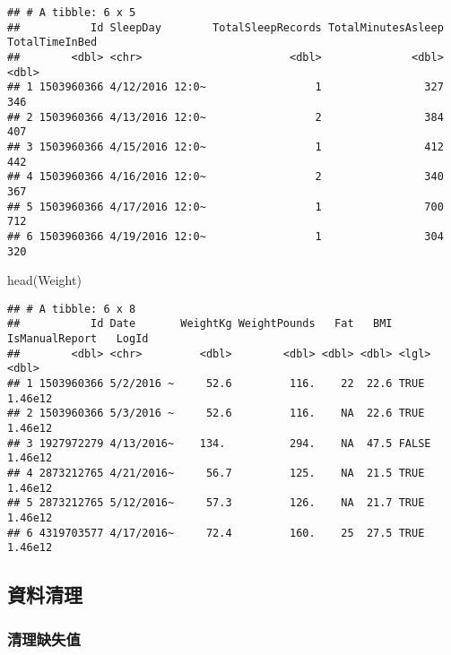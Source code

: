 \documentclass[
]{article}
\newenvironment{Shaded}{\begin{snugshade}}{\end{snugshade}}
\newcommand{\FunctionTok}[1]{\textcolor[rgb]{0.00,0.00,0.00}{#1}}
\newcommand{\NormalTok}[1]{#1}
\begin{document}
\begin{verbatim}
## # A tibble: 6 x 5
##           Id SleepDay        TotalSleepRecords TotalMinutesAsleep TotalTimeInBed
##        <dbl> <chr>                       <dbl>              <dbl>          <dbl>
## 1 1503960366 4/12/2016 12:0~                 1                327            346
## 2 1503960366 4/13/2016 12:0~                 2                384            407
## 3 1503960366 4/15/2016 12:0~                 1                412            442
## 4 1503960366 4/16/2016 12:0~                 2                340            367
## 5 1503960366 4/17/2016 12:0~                 1                700            712
## 6 1503960366 4/19/2016 12:0~                 1                304            320
\end{verbatim}

\begin{Shaded}
\begin{Highlighting}[]
\FunctionTok{head}\NormalTok{(Weight)}
\end{Highlighting}
\end{Shaded}

\begin{verbatim}
## # A tibble: 6 x 8
##           Id Date       WeightKg WeightPounds   Fat   BMI IsManualReport   LogId
##        <dbl> <chr>         <dbl>        <dbl> <dbl> <dbl> <lgl>            <dbl>
## 1 1503960366 5/2/2016 ~     52.6         116.    22  22.6 TRUE           1.46e12
## 2 1503960366 5/3/2016 ~     52.6         116.    NA  22.6 TRUE           1.46e12
## 3 1927972279 4/13/2016~    134.          294.    NA  47.5 FALSE          1.46e12
## 4 2873212765 4/21/2016~     56.7         125.    NA  21.5 TRUE           1.46e12
## 5 2873212765 5/12/2016~     57.3         126.    NA  21.7 TRUE           1.46e12
## 6 4319703577 4/17/2016~     72.4         160.    25  27.5 TRUE           1.46e12
\end{verbatim}

\hypertarget{ux8cc7ux6599ux6e05ux7406}{%
\subsection{資料清理}\label{ux8cc7ux6599ux6e05ux7406}}

\hypertarget{ux6e05ux7406ux7f3aux5931ux503c}{%
\subsubsection{清理缺失值}\label{ux6e05ux7406ux7f3aux5931ux503c}}
\end{document}
